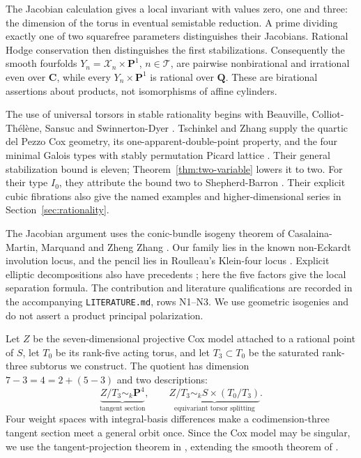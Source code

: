 \documentclass[11pt]{article}
\theoremstyle{remark}
\newcommand{\C}{\mathbf C}
\newcommand{\PP}{\mathbf P}
\begin{document}
The Jacobian calculation gives a local invariant with values zero, one and
three: the dimension of the torus in eventual semistable reduction. A prime
dividing exactly one of two squarefree parameters distinguishes their
Jacobians. Rational Hodge conservation
\cite[Theorem~1.3]{RuddM1} then distinguishes the first stabilizations.
Consequently the smooth fourfolds
\(Y_n=\mathcal X_n\times\PP^1\), \(n\in\mathcal T\), are pairwise
nonbirational and irrational even over \(\C\), while every
\(Y_n\times\PP^1\) is rational over \(\mathbf Q\).
These are birational assertions about products, not isomorphisms of affine
cylinders.

The use of universal torsors in stable rationality begins with
Beauville, Colliot-Th\'el\`ene, Sansuc and Swinnerton-Dyer \cite{BCTSSD}.
Tschinkel and Zhang supply the quartic del Pezzo Cox geometry, its
one-apparent-double-point property, and the four minimal Galois types with
stably permutation Picard lattice \cite{TZ}. Their general stabilization
bound is eleven; Theorem~\ref{thm:two-variable} lowers it to two. For their
type \(I_0\), they attribute the bound two to Shepherd-Barron
\cite{ShepherdBarron}. Their explicit cubic fibrations also give the named
examples and higher-dimensional series in Section~\ref{sec:rationality}.

The Jacobian argument uses the conic-bundle isogeny theorem of
Casalaina-Martin, Marquand and Zheng Zhang \cite[Theorem~2.9]{CMZ}.
Our family lies in the known non-Eckardt involution locus, and the pencil
lies in Roulleau's Klein-four locus \cite[\S3.3]{RoulleauGenusTwo}.
Explicit elliptic decompositions also have precedents
\cite{Roulleau,vanGeemenYamauchi}; here the five factors give the local
separation formula. The contribution and literature qualifications are
recorded in the accompanying \texttt{LITERATURE.md}, rows N1--N3.
We use geometric isogenies and do not assert a product principal polarization.

Let \(Z\) be the seven-dimensional projective Cox model attached to a
rational point of \(S\), let \(T_0\) be its rank-five acting torus, and
let \(T_3\subset T_0\) be the saturated rank-three subtorus we construct.
The quotient has dimension \(7-3=4=2+(5-3)\) and two descriptions:
\[
 \underbrace{Z/T_3\sim_k\PP^4}_{\text{tangent section}},\qquad
 \underbrace{Z/T_3\sim_k S\times(T_0/T_3)}_{\text{equivariant torsor splitting}}.
\]
Four weight spaces with integral-basis differences make a codimension-three
tangent section meet a general orbit once. Since the Cox model may be
singular, we use the tangent-projection theorem in
\cite[Theorem~2.4]{TZ}, extending the smooth theorem of
\cite[Corollary~4.2]{CMR}.
\end{document}
